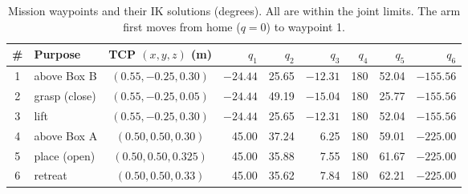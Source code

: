 \documentclass[11pt,a4paper]{article}
\begin{document}
\begin{table}[h]
\centering\small
\begin{tabular}{clcrrrrrr}
\toprule
\# & Purpose & TCP \((x,y,z)\) (m) & \(q_1\) & \(q_2\) & \(q_3\) & \(q_4\) & \(q_5\) & \(q_6\) \\
\midrule
1 & above Box B & \((0.55,-0.25,0.30)\) & \(-24.44\) & 25.65 & \(-12.31\) & 180 & 52.04 & \(-155.56\) \\
2 & grasp (close) & \((0.55,-0.25,0.05)\) & \(-24.44\) & 49.19 & \(-15.04\) & 180 & 25.77 & \(-155.56\) \\
3 & lift & \((0.55,-0.25,0.30)\) & \(-24.44\) & 25.65 & \(-12.31\) & 180 & 52.04 & \(-155.56\) \\
4 & above Box A & \((0.50,0.50,0.30)\) & 45.00 & 37.24 & 6.25 & 180 & 59.01 & \(-225.00\) \\
5 & place (open) & \((0.50,0.50,0.325)\) & 45.00 & 35.88 & 7.55 & 180 & 61.67 & \(-225.00\) \\
6 & retreat & \((0.50,0.50,0.33)\) & 45.00 & 35.62 & 7.84 & 180 & 62.21 & \(-225.00\) \\
\bottomrule
\end{tabular}
\caption{Mission waypoints and their IK solutions (degrees). All are within the joint
limits. The arm first moves from home (\(q=0\)) to waypoint 1.}
\label{tab:waypoints}
\end{table}
\end{document}
